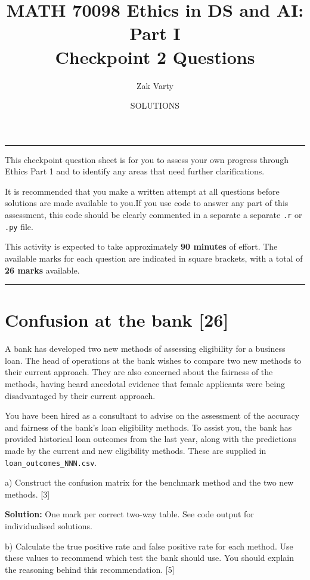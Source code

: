 \documentclass[a4paper, 11pt]{article}
\title{MATH 70098 Ethics in DS and AI: Part I \\ \textbf{Checkpoint 2 Questions}}
\author{Zak Varty}
\date{SOLUTIONS}
\begin{document}
\maketitle

\hrule

This checkpoint question sheet is for you to assess your own progress through Ethics Part 1 and to identify any areas that need further clarifications. 

It is recommended that you make a written attempt at all questions before solutions are made available to you.If you use code to answer any part of this assessment, this code should be clearly commented in a separate a separate \texttt{.r} or \texttt{.py} file. 

This activity is expected to take approximately \textbf{90 minutes} of effort. The available marks for each question are indicated in square brackets, with a total of \textbf{26 marks} available.
 
\vspace{1em} 
 
\hrule


\section{Confusion at the bank [26] }

A bank has developed two new methods of assessing eligibility for a business loan. The head of operations at the bank wishes to compare two new methods to their current approach. They are also concerned about the fairness of the methods, having heard anecdotal evidence that female applicants were being disadvantaged by their current approach.

You have been hired as a consultant to advise on the assessment of the accuracy and fairness of the bank's loan eligibility methods. To assist you, the bank has provided historical loan outcomes from the last year, along with the predictions made by the current and new eligibility methods.  These are supplied in \texttt{loan\_outcomes\_NNN.csv}. 


a) Construct the confusion matrix for the benchmark method and the two new methods. [3]

{\color{blue}
\textbf{Solution:} One mark per correct two-way table. See code output for individualised solutions.
}

b) Calculate the true positive rate and false positive rate for each method. Use these values to recommend which test the bank should use. You should explain the reasoning behind this recommendation. [5]
\end{document}
